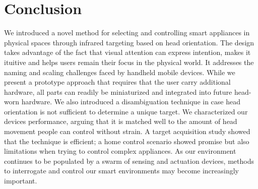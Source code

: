 \section{Conclusion}
We introduced a novel method for selecting and controlling smart appliances in physical spaces through  infrared targeting based on head orientation. The design takes advantage of the fact that visual attention can express intention, makes it ituitive and helps users remain their focus in the physical world. It addresses the naming and scaling challenges faced by handheld mobile devices. While we present a prototype approach that requires that the user carry additional hardware, all parts can readily be miniaturized and integrated into future head-worn hardware. We also introduced a disambiguation technique in case head orientation is not sufficient to determine a unique target. We characterized our devices performance, arguing that it is matched well to the amount of head movement people can control without strain. A target acquisition study showed that the technique is efficient; a home control scenario showed promise but also limitations when trying to control complex appliances. As our environment continues to be populated by a swarm of sensing and actuation devices, methods to interrogate and control our smart environments may become increasingly important.
